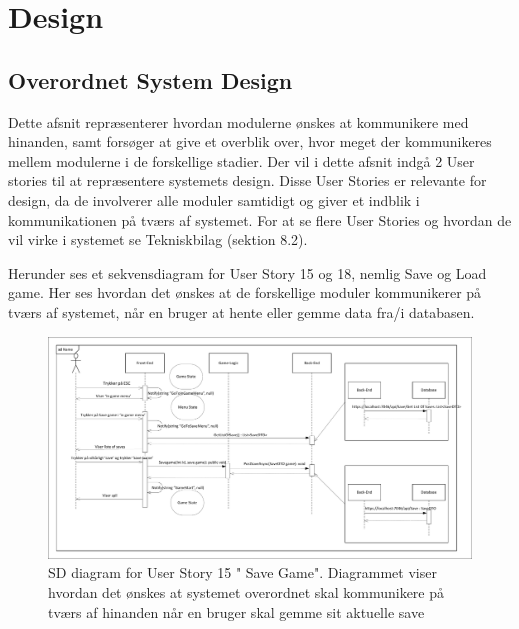\section{Design}

\subsection{Overordnet System Design}
\noindent Dette afsnit repræsenterer hvordan modulerne ønskes at kommunikere med hinanden, samt forsøger at give et overblik over, hvor meget der kommunikeres mellem modulerne i de forskellige stadier. Der vil i dette afsnit indgå 2 User stories til at repræsentere systemets design. Disse User Stories er relevante for design, da de involverer alle moduler samtidigt og giver et indblik i kommunikationen på tværs af systemet. For at se flere User Stories og hvordan de vil virke i systemet se Tekniskbilag (sektion 8.2).

\noindent Herunder ses et sekvensdiagram for User Story 15 og 18, nemlig Save og Load game. Her ses hvordan det ønskes at de forskellige moduler kommunikerer på tværs af systemet, når en bruger at hente eller gemme data fra/i databasen.
\begin{figure}[H]
\centering
\includegraphics[width = \textwidth]{02-Body/Images/Arkitektur-SDSaveGame}
\caption{SD diagram for User Story 15 " Save Game". Diagrammet viser hvordan det ønskes at systemet overordnet skal kommunikere på tværs af hinanden når en bruger skal gemme sit aktuelle save}
\label{fig:Arkitektur-SD-SaveGame}
\end{figure}

